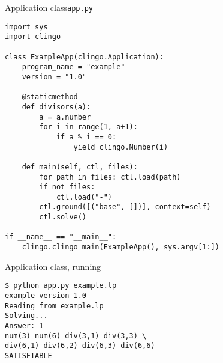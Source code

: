 \begin{frame}{Application class}{\texttt{app.py}}
\begin{lstlisting}
import sys
import clingo

class ExampleApp(clingo.Application):
    program_name = "example"
    version = "1.0"

    @staticmethod
    def divisors(a):
        a = a.number
        for i in range(1, a+1):
            if a % i == 0:
                yield clingo.Number(i)

    def main(self, ctl, files):
        for path in files: ctl.load(path)
        if not files:
            ctl.load("-")
        ctl.ground([("base", [])], context=self)
        ctl.solve()

if __name__ == "__main__":
    clingo.clingo_main(ExampleApp(), sys.argv[1:])
\end{lstlisting}
\end{frame}
\begin{frame}[fragile]{Application class, running}
  \bigskip
\begin{lstlisting}
$ python app.py example.lp
example version 1.0
Reading from example.lp
Solving...
Answer: 1
num(3) num(6) div(3,1) div(3,3) \
div(6,1) div(6,2) div(6,3) div(6,6)
SATISFIABLE
\end{lstlisting}
\end{frame}
%
